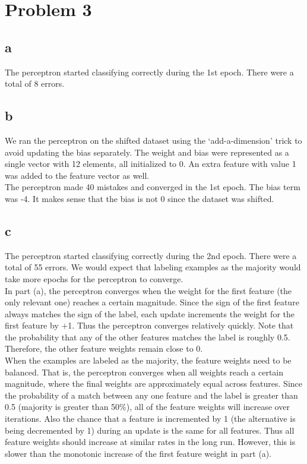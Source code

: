 \documentclass{article}
\begin{document}
\section*{Problem 3}
\subsection*{a}
The perceptron started classifying correctly during the 1st epoch. There were a total of 8 errors.\\

\subsection*{b}
We ran the perceptron on the shifted dataset using the \lq{}add-a-dimension\rq{} trick to avoid updating the bias separately. The weight and bias were represented as a single vector with 12 elements, all initialized to 0. An extra feature with value 1 was added to the feature vector as well.\\

The perceptron made 40 mistakes and converged in the 1st epoch. The bias term was -4. It makes sense that the bias is not 0 since the dataset was shifted.\\

\subsection*{c}
The perceptron started classifying correctly during the 2nd epoch. There were a total of 55 errors. We would expect that labeling examples as the majority would take more epochs for the perceptron to converge.\\

In part (a), the perceptron converges when the weight for the first feature (the only relevant one) reaches a certain magnitude. Since the sign of the first feature always matches the sign of the label, each update increments the weight for the first feature by +1. Thus the perceptron converges relatively quickly. Note that the probability that any of the other features matches the label is roughly 0.5. Therefore, the other feature weights remain close to 0.\\

When the examples are labeled as the majority, the feature weights need to be balanced. That is, the perceptron converges when all weights reach a certain magnitude, where the final weights are approximately equal across features. Since the probability of a match between any one feature and the label is greater than 0.5 (majority is greater than 50\%), all of the feature weights will increase over iterations. Also the chance that a feature is incremented by 1 (the alternative is being decremented by 1) during an update is the same for all features. Thus all feature weights should increase at similar rates in the long run. However, this is slower than the monotonic increase of the first feature weight in part (a).\\
\end{document}
